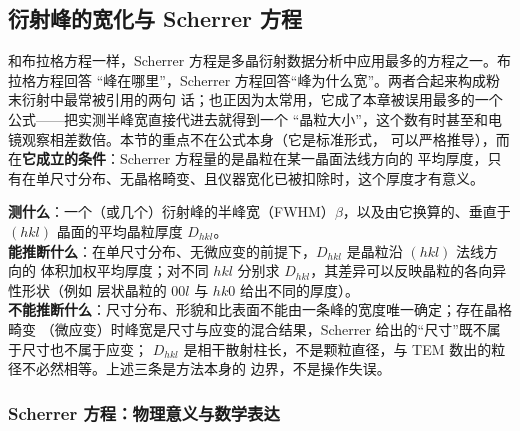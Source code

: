 \subsection{衍射峰的宽化与 Scherrer 方程}

和布拉格方程一样，Scherrer 方程是多晶衍射数据分析中应用最多的方程之一。布拉格方程回答
``峰在哪里''，Scherrer 方程回答``峰为什么宽''。两者合起来构成粉末衍射中最常被引用的两句
话；也正因为太常用，它成了本章被误用最多的一个公式——把实测半峰宽直接代进去就得到一个
``晶粒大小''，这个数有时甚至和电镜观察相差数倍。本节的重点不在公式本身（它是标准形式，
可以严格推导），而在\textbf{它成立的条件}：Scherrer 方程量的是晶粒在某一晶面法线方向的
平均厚度，只有在单尺寸分布、无晶格畸变、且仪器宽化已被扣除时，这个厚度才有意义。

\begin{probout}
\textbf{测什么}：一个（或几个）衍射峰的半峰宽（FWHM）$\beta$，以及由它换算的、垂直于
$(hkl)$ 晶面的平均晶粒厚度 $D_{hkl}$。\\
\textbf{能推断什么}：在单尺寸分布、无微应变的前提下，$D_{hkl}$ 是晶粒沿 $(hkl)$ 法线方向的
体积加权平均厚度；对不同 $hkl$ 分别求 $D_{hkl}$，其差异可以反映晶粒的各向异性形状（例如
层状晶粒的 $00l$ 与 $hk0$ 给出不同的厚度）。\\
\textbf{不能推断什么}：尺寸分布、形貌和比表面不能由一条峰的宽度唯一确定；存在晶格畸变
（微应变）时峰宽是尺寸与应变的混合结果，Scherrer 给出的``尺寸''既不属于尺寸也不属于应变；
$D_{hkl}$ 是相干散射柱长，不是颗粒直径，与 TEM 数出的粒径不必然相等。上述三条是方法本身的
边界，不是操作失误。
\end{probout}

\subsubsection{Scherrer 方程：物理意义与数学表达}

